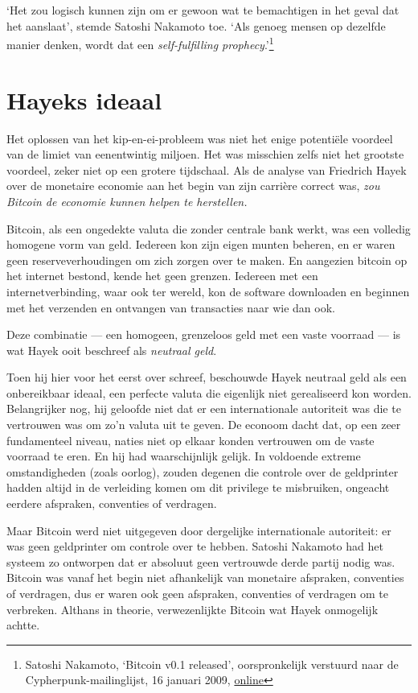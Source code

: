 \documentclass[
  a5paper,
  smalldemyvopaper,11pt,twoside,onecolumn,openright,extrafontsizes]{memoir}
\begin{document}
`Het zou logisch kunnen zijn om er gewoon wat te bemachtigen in het
geval dat het aanslaat', stemde Satoshi Nakamoto toe. `Als genoeg mensen
op dezelfde manier denken, wordt dat een \emph{self-fulfilling
prophecy}.'\footnote{Satoshi Nakamoto, `Bitcoin v0.1 released',
  oorspronkelijk verstuurd naar de Cypherpunk-mailinglijst, 16 januari
  2009,
  \href{https://www.metzdowd.com/pipermail/cryptography/2009-January/015014.html}{online}}

\section{Hayeks ideaal}\label{hayeks-ideaal}

Het oplossen van het kip-en-ei-probleem was niet het enige potentiële
voordeel van de limiet van eenentwintig miljoen. Het was misschien zelfs
niet het grootste voordeel, zeker niet op een grotere tijdschaal. Als de
analyse van Friedrich Hayek over de monetaire economie aan het begin van
zijn carrière correct was, \emph{zou Bitcoin de economie kunnen helpen
te herstellen.}

Bitcoin, als een ongedekte valuta die zonder centrale bank werkt, was
een volledig homogene vorm van geld. Iedereen kon zijn eigen munten
beheren, en er waren geen reserveverhoudingen om zich zorgen over te
maken. En aangezien bitcoin op het internet bestond, kende het geen
grenzen. Iedereen met een internetverbinding, waar ook ter wereld, kon
de software downloaden en beginnen met het verzenden en ontvangen van
transacties naar wie dan ook.

Deze combinatie --- een homogeen, grenzeloos geld met een vaste voorraad
--- is wat Hayek ooit beschreef als \emph{neutraal geld}.

Toen hij hier voor het eerst over schreef, beschouwde Hayek neutraal
geld als een onbereikbaar ideaal, een perfecte valuta die eigenlijk niet
gerealiseerd kon worden. Belangrijker nog, hij geloofde niet dat er een
internationale autoriteit was die te vertrouwen was om zo'n valuta uit
te geven. De econoom dacht dat, op een zeer fundamenteel niveau, naties
niet op elkaar konden vertrouwen om de vaste voorraad te eren. En hij
had waarschijnlijk gelijk. In voldoende extreme omstandigheden (zoals
oorlog), zouden degenen die controle over de geldprinter hadden altijd
in de verleiding komen om dit privilege te misbruiken, ongeacht eerdere
afspraken, conventies of verdragen.

Maar Bitcoin werd niet uitgegeven door dergelijke internationale
autoriteit: er was geen geldprinter om controle over te hebben. Satoshi
Nakamoto had het systeem zo ontworpen dat er absoluut geen vertrouwde
derde partij nodig was. Bitcoin was vanaf het begin niet afhankelijk van
monetaire afspraken, conventies of verdragen, dus er waren ook geen
afspraken, conventies of verdragen om te verbreken. Althans in theorie,
verwezenlijkte Bitcoin wat Hayek onmogelijk achtte.
\end{document}
